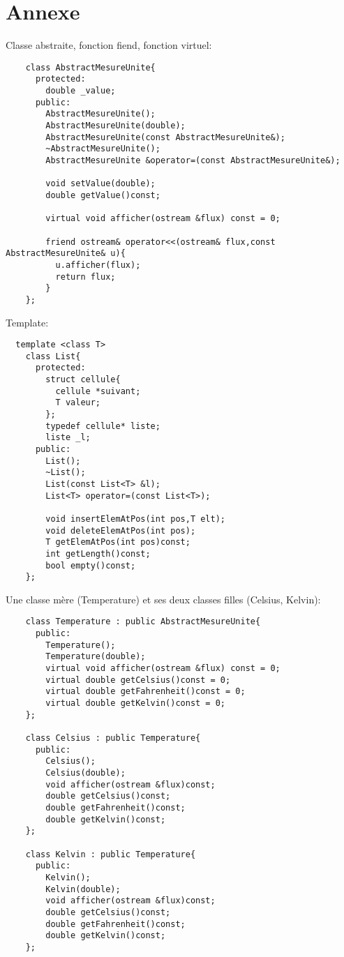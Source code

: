 \documentclass[12pt]{report}
\begin{document}
      \section{Annexe}

      Classe abstraite, fonction fiend, fonction virtuel:
      \begin{verbatim}
    class AbstractMesureUnite{
      protected:
        double _value;
      public:
        AbstractMesureUnite();
        AbstractMesureUnite(double);
        AbstractMesureUnite(const AbstractMesureUnite&);
        ~AbstractMesureUnite();
        AbstractMesureUnite &operator=(const AbstractMesureUnite&);

        void setValue(double);
        double getValue()const;

        virtual void afficher(ostream &flux) const = 0;

        friend ostream& operator<<(ostream& flux,const AbstractMesureUnite& u){
          u.afficher(flux);
          return flux;
        }
    };
      \end{verbatim}

      Template:
      \\\begin{verbatim}
  template <class T>
    class List{
      protected:
        struct cellule{
          cellule *suivant;
          T valeur;
        };
        typedef cellule* liste;
        liste _l;
      public:
        List();
        ~List();
        List(const List<T> &l);
        List<T> operator=(const List<T>);

        void insertElemAtPos(int pos,T elt);
        void deleteElemAtPos(int pos);
        T getElemAtPos(int pos)const;
        int getLength()const;
        bool empty()const;
    };
    \end{verbatim}

    Une classe mère (Temperature) et ses deux classes filles (Celsius, Kelvin):

    \begin{verbatim}
    class Temperature : public AbstractMesureUnite{
      public:
        Temperature();
        Temperature(double);
        virtual void afficher(ostream &flux) const = 0;
        virtual double getCelsius()const = 0;
        virtual double getFahrenheit()const = 0;
        virtual double getKelvin()const = 0;
    };

    class Celsius : public Temperature{
      public:
        Celsius();
        Celsius(double);
        void afficher(ostream &flux)const;
        double getCelsius()const;
        double getFahrenheit()const;
        double getKelvin()const;
    };

    class Kelvin : public Temperature{
      public:
        Kelvin();
        Kelvin(double);
        void afficher(ostream &flux)const;
        double getCelsius()const;
        double getFahrenheit()const;
        double getKelvin()const;
    };
    \end{verbatim}
\end{document}
